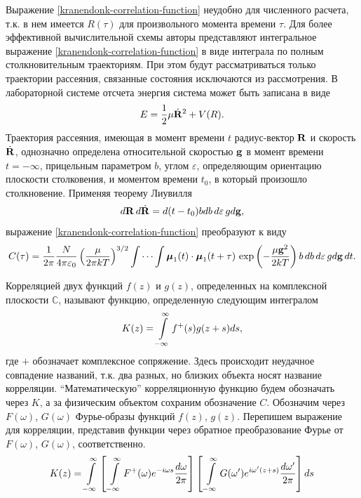 Выражение \eqref{kranendonk-correlation-function} неудобно для численного расчета, т.к. в нем имеется $R(\tau)$ для произвольного момента времени $\tau$. Для более эффективной вычислительной схемы авторы представляют интегральное выражение \eqref{kranendonk-correlation-function} в виде интеграла по полным столкновительным траекториям. При этом будут рассматриваться только траектории рассеяния, связанные состояния исключаются из рассмотрения. В лабораторной системе отсчета энергия система может быть записана в виде
\begin{gather}
    E = \frac{1}{2} \mu \dot{\mathbf{R}}^2 + V(R).
\end{gather}
Траектория рассеяния, имеющая в момент времени $t$ радиус-вектор $\mathbf{R}$ и скорость $\dot{\mathbf{R}}$, однозначно определена относительной скоростью $\mathbf{g}$ в момент времени $t = -\infty$, прицельным параметром $b$, углом $\varepsilon$, определяющим ориентацию плоскости столковения, и моментом времени $t_0$, в который произошло столкновение. Применяя теорему Лиувилля
\begin{gather}
    d \mathbf{R} \, d\dot{\mathbf{R}} = d(t - t_0) b db \, d\varepsilon \, g d\mathbf{g},
\end{gather}
%
выражение \eqref{kranendonk-correlation-function} преобразуют к виду
\begin{gather}
    C(\tau) = \frac{1}{2 \pi} \frac{N}{4 \pi \varepsilon_0} \left( \frac{\mu}{2 \pi k T} \right)^{3/2} \idotsint \boldsymbol{\mu}_1(t) \cdot \boldsymbol{\mu}_1(t + \tau) \, \exp \left( - \frac{\mu \mathbf{g}^2}{2 k T} \right) b \, db \, d\varepsilon \, g d \mathbf{g} \, dt. \label{correlation-function-kranendonk}
\end{gather}

Корреляцией двух функций $f(z)$ и $g(z)$, определенных на комплексной плоскости $\mathbb{C}$, называют функцию, определенную следующим интегралом
\begin{gather}
    K(z) = \int\limits_{-\infty}^\infty f^+(s) g(z + s) ds,
\end{gather}
% 
где $+$ обозначает комплексное сопряжение. Здесь происходит неудачное совпадение названий, т.к. два разных, но близких объекта носят название корреляции. \enquote{Математическую} корреляционную функцию будем обозначать через $K$, а за физическим объектом сохраним обозначение $C$. Обозначим через $F(\omega)$, $G(\omega)$ Фурье-образы функций $f(z)$, $g(z)$. Перепишем выражение для корреляции, представив функции через обратное преобразование Фурье от $F(\omega)$, $G(\omega)$, соответственно.
\begin{gather}
    K(z) = \int\limits_{-\infty}^\infty \left[ \, \int\limits_{-\infty}^\infty F^+(\omega) e^{-i \omega s} \frac{d \omega}{2 \pi} \right] \left[ \, \int\limits_{-\infty}^\infty G(\omega^\prime) e^{i \omega^\prime (z + s)} \frac{d\omega^\prime}{2 \pi} \right] ds
\end{gather}

